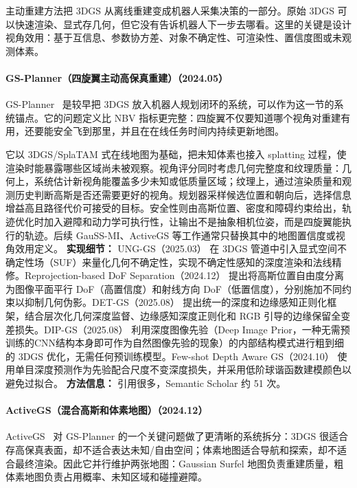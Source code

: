 主动重建方法把 3DGS 从离线重建变成机器人采集决策的一部分。原始 3DGS 可以快速渲染、显式存几何，但它没有告诉机器人下一步去哪看。这里的关键是设计视角效用：基于互信息、参数协方差、对象不确定性、可渲染性、置信度图或未观测体素。
\paragraph{GS-Planner（四旋翼主动高保真重建）（2024.05）}
GS-Planner~\cite{2405_10142} 是较早把 3DGS 放入机器人规划闭环的系统，可以作为这一节的系统锚点。它的问题定义比 NBV 指标更完整：四旋翼不仅要知道哪个视角对重建有用，还要能安全飞到那里，并且在在线任务时间内持续更新地图。

它以 3DGS/SplaTAM 式在线地图为基础，把未知体素也接入 splatting 过程，使渲染时能暴露哪些区域尚未被观察。视角评分同时考虑几何完整度和纹理质量：几何上，系统估计新视角能覆盖多少未知或低质量区域；纹理上，通过渲染质量和观测历史判断高斯是否还需要更好的视角。规划器采样候选位置和朝向后，选择信息增益高且路径代价可接受的目标。安全性则由高斯位置、密度和障碍约束给出，轨迹优化时加入避障和动力学可执行性，让输出不是抽象相机位姿，而是四旋翼能执行的轨迹。后续 GauSS-MI、ActiveGS 等工作通常只替换其中的地图置信度或视角效用定义。
\textbf{实现细节：} UNG-GS（2025.03） 在 3DGS 管道中引入显式空间不确定性场（SUF）来量化几何不确定性，实现不确定性感知的深度渲染和法线精修。Reprojection-based DoF Separation（2024.12） 提出将高斯位置自由度分离为图像平面平行 DoF（高置信度）和射线方向 DoF（低置信度），分别施加不同约束以抑制几何伪影。DET-GS（2025.08） 提出统一的深度和边缘感知正则化框架，结合层次化几何深度监督、边缘感知深度正则化和 RGB 引导的边缘保留全变差损失。DIP-GS（2025.08） 利用深度图像先验（Deep Image Prior，一种无需预训练的CNN结构本身即可作为自然图像先验的现象）的内部结构模式进行粗到细的 3DGS 优化，无需任何预训练模型。Few-shot Depth Aware GS（2024.10） 使用单目深度预测作为先验配合尺度不变深度损失，并采用低阶球谐函数建模颜色以避免过拟合。
\textbf{方法信息：} 引用很多，Semantic Scholar 约 51 次。
\paragraph{ActiveGS（混合高斯和体素地图）（2024.12）}
ActiveGS~\cite{2412_17769} 对 GS-Planner 的一个关键问题做了更清晰的系统拆分：3DGS 很适合存高保真表面，却不适合表达未知/自由空间；体素地图适合导航和探索，却不适合最终渲染。因此它并行维护两张地图：Gaussian Surfel 地图负责重建质量，粗体素地图负责占用概率、未知区域和碰撞避障。

